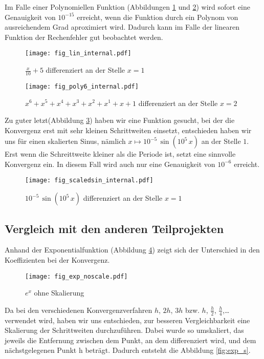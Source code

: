 \documentclass{scrartcl}
\begin{document}
Im Falle einer Polynomiellen Funktion (Abbildungen \ref{fig:lin} und \ref{fig:poly6}) wird sofort eine Genauigkeit von \(10^{-15}\) erreicht, wenn die Funktion durch ein Polynom von ausreichendem Grad aproximiert wird.
Dadurch kann im Falle der linearen Funktion der Rechenfehler gut beobachtet werden.


\begin{figure}[!htb]
\centering
\texttt{[image: fig\_lin\_internal.pdf]}
\caption{\(\frac x {10} + 5\) differenziert an der Stelle \(x=1\)}
\label{fig:lin}
\end{figure}

\begin{figure}[!htb]
\centering
\texttt{[image: fig\_poly6\_internal.pdf]}
\caption{\(x^6+x^5+x^4+x^3+x^2+x^1+x+1\) differenziert an der Stelle \(x=2\)}
\label{fig:poly6}
\end{figure}


Zu guter letzt(Abbildung \ref{fig:scaledsin})
haben wir eine Funktion gesucht, bei der die Konvergenz erst mit sehr kleinen
Schrittweiten einsetzt, entschieden haben wir uns für einen skalierten Sinus,
nämlich \(x \mapsto 10^{-5}\, \sin(10^5\, x)\) an der Stelle \(1\).
Erst wenn die Schreittweite kleiner als die Periode ist, setzt eine sinnvolle Konvergenz ein. In diesem Fall wird auch nur eine Genauigkeit von \(10^{-6}\) erreicht.


\begin{figure}[!htb]
\centering
\texttt{[image: fig\_scaledsin\_internal.pdf]}
\caption{\(10^{-5}\, \sin(10^5\, x)\) differenziert an der Stelle \(x=1\)}
\label{fig:scaledsin}
\end{figure}


\subsection{Vergleich mit den anderen Teilprojekten}

Anhand der Exponentialfunktion (Abbildung \ref{fig:exp_ns}) zeigt sich der Unterschied in den Koeffizienten bei der Konvergenz.

\begin{figure}[!htb]
\centering
\texttt{[image: fig\_exp\_noscale.pdf]}
\caption{\(e^x\) ohne Skalierung}
\label{fig:exp_ns}
\end{figure}

Da bei den verschiedenen Konvergenzverfahren \(h\), \(2h\), \(3h\) bzw. \(h\), \(\frac h 2\), \(\frac h 4\),\dots
verwendet wird, haben wir uns entschieden, zur besseren Vergleichbarkeit eine Skalierung der Schrittweiten durchzuführen.
Dabei wurde so umskaliert, das jeweils die Entfernung zwischen dem Punkt, an dem differenziert wird, und dem nächstgelegenen Punkt h beträgt.
Dadurch entsteht die Abbildung \ref{fig:exp_s}.
\end{document}
